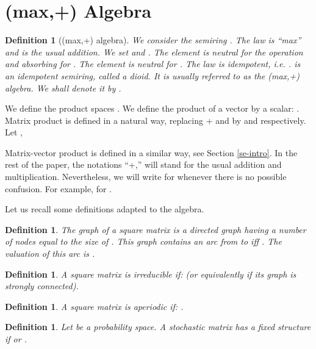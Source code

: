 \documentclass[11pt,titlepage]{article}
\newcommand{\parag}{\medskip\noindent}
\newtheorem{defi}[theo]{Definition }
\begin{document}
\section{(max,+) Algebra}
\label{se:m+a}
\begin{defi}[(max,+) algebra]
We consider the semiring .
The law  is ``max'' and  is the usual addition.
We set 
 and .
The element  is neutral for the operation  and absorbing for
. 
The element  is neutral for . The law  is idempotent, i.e.
.  is an idempotent semiring,
called 
a dioid. It is usually referred to as the
(max,+) algebra.
We shall denote it by . 
\end{defi}

We define the product spaces . We
define the product of a vector by a scalar: . \\
Matrix product is defined in a natural way, replacing + and  by
 and  respectively.
Let ,

Matrix-vector product is defined in a similar way, see Section \ref{se-intro}.
In the rest of the paper, the notations ``+,'' will stand for
the usual addition and multiplication.
Nevertheless, we will write  for  whenever there is no
possible confusion. For example, for .

\parag


Let us recall some definitions adapted to the  algebra.

\begin{defi}
The graph of a square matrix  is a directed graph having a number of
nodes equal to the size of . This graph contains an arc from  to  iff
. The valuation of this arc is . 
\label{de:comgr}
\end {defi}

\begin{defi}
A square matrix  is
irreducible if:  
 (or equivalently
if its graph is strongly connected). 
\end {defi}

\begin{defi}
\label{ape}
A square matrix  is aperiodic if:  .
\end {defi}

\begin{defi}
Let  be a
probability space. 
A stochastic matrix  has a fixed structure
if  
 or .
\label{struc}
\end {defi}
\end{document}
